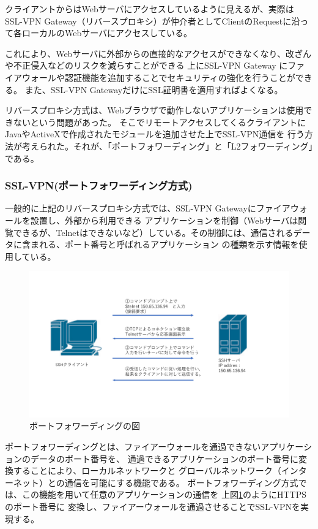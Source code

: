 \documentclass[12pt,a4paper,titlepage]{jreport}
\begin{document}
クライアントからはWebサーバにアクセスしているように見えるが、実際は
SSL-VPN Gateway（リバースプロキシ）が仲介者としてClientのRequestに沿って各ローカルのWebサーバにアクセスしている。

これにより、Webサーバに外部からの直接的なアクセスができなくなり、改ざんや不正侵入などのリスクを減らすことができる
上にSSL-VPN Gateway にファイアウォールや認証機能を追加することでセキュリティの強化を行うことができる。
また、SSL-VPN GatewayだけにSSL証明書を適用すればよくなる。

リバースプロキシ方式は、Webブラウザで動作しないアプリケーションは使用できないという問題があった。
そこでリモートアクセスしてくるクライアントにJavaやActiveXで作成されたモジュールを追加させた上でSSL-VPN通信を
行う方法が考えられた。それが、「ポートフォワーディング」と「L2フォワーディング」である。

\subsubsection*{SSL-VPN(ポートフォワーディング方式)}

一般的に上記のリバースプロキシ方式では、SSL-VPN Gatewayにファイアウォールを設置し、外部から利用できる
アプリケーションを制御（Webサーバは閲覧できるが、Telnetはできないなど）している。その制御には、通信されるデータに含まれる、ポート番号と呼ばれるアプリケーション
の種類を示す情報を使用している。
\begin{figure}[h]
    \centering
    \includegraphics[width=1.0\textwidth, page=17]{graphs/network_archtecture.pdf}
    \caption{ポートフォワーディングの図}
    \label{portfowarding}
\end{figure}

ポートフォワーディングとは、ファイアーウォールを通過できないアプリケーションのデータのポート番号を、
通過できるアプリケーションのポート番号に変換することにより、ローカルネットワークと
グローバルネットワーク（インターネット）との通信を可能にする機能である。
ポートフォワーディング方式では、この機能を用いて任意のアプリケーションの通信を
上図\ref{portfowarding}のようにHTTPSのポート番号に
変換し、ファイアーウォールを通過させることでSSL-VPNを実現する。
\end{document}
